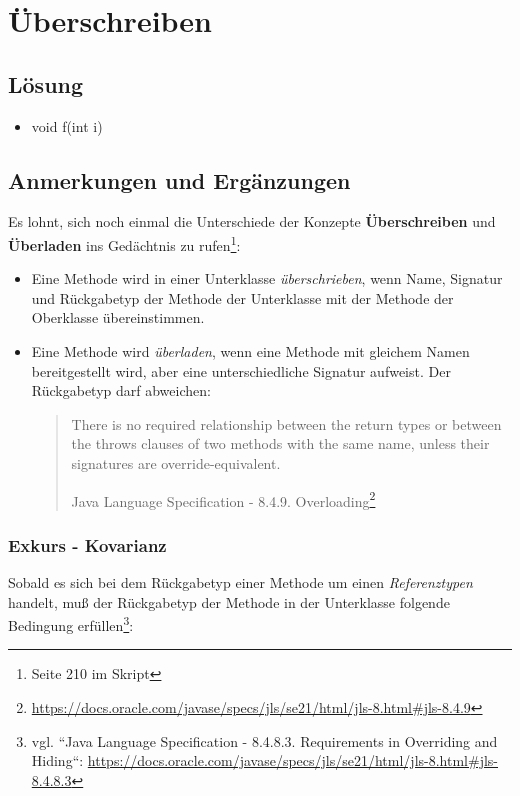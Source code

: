 \chapter{Überschreiben}

\section*{Lösung}

\begin{itemize}
    \item void f(int i)
\end{itemize}


\section*{Anmerkungen und Ergänzungen}

Es lohnt, sich noch einmal die Unterschiede der Konzepte \textbf{Überschreiben} und \textbf{Überladen}
ins Gedächtnis zu rufen\footnote{Seite 210 im Skript}:

\begin{itemize}
    \item Eine Methode wird in einer Unterklasse \textit{überschrieben}, wenn Name, Signatur und Rückgabetyp der Methode der Unterklasse mit der
    Methode der Oberklasse übereinstimmen.
    \item Eine Methode wird \textit{überladen}, wenn eine Methode mit gleichem Namen bereitgestellt wird, aber eine unterschiedliche Signatur
    aufweist.
    Der Rückgabetyp darf abweichen:
    \blockquote[Java Language Specification - 8.4.9. Overloading\footnote{\url{https://docs.oracle.com/javase/specs/jls/se21/html/jls-8.html#jls-8.4.9}}]{
        There is no required relationship between the return types or between the throws clauses of two methods with the same name, unless their signatures are override-equivalent.
    }
\end{itemize}

\subsection*{Exkurs - Kovarianz}
Sobald es sich bei dem Rückgabetyp einer Methode um einen \textit{Referenztypen} handelt, muß der Rückgabetyp der Methode in der Unterklasse
folgende Bedingung erfüllen\footnote{
vgl. ``Java Language Specification - 8.4.8.3. Requirements in Overriding and Hiding``: \url{https://docs.oracle.com/javase/specs/jls/se21/html/jls-8.html#jls-8.4.8.3}
}:

